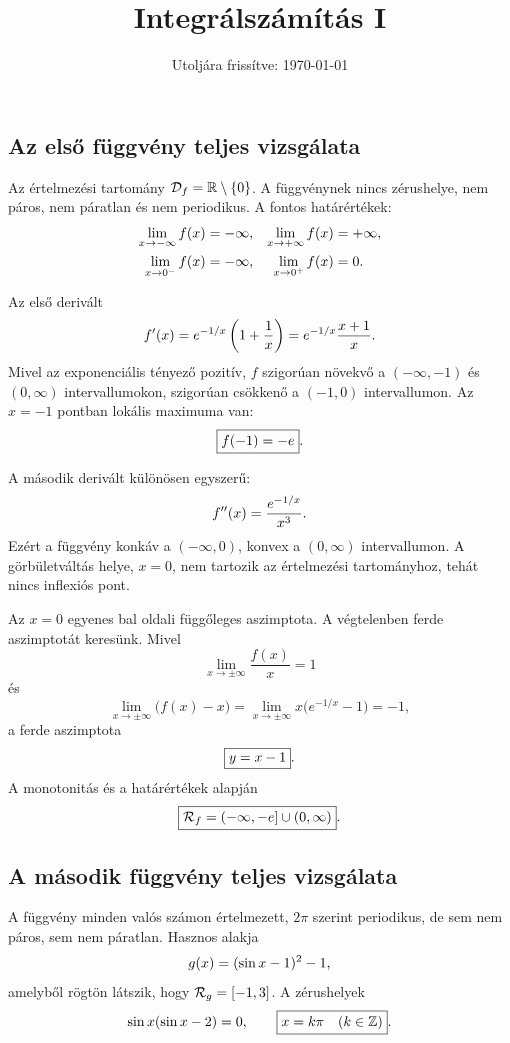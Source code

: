 \documentclass{szb-solution}
\title{Integrálszámítás I}
\date{Utoljára frissítve: \today}
\begin{document}
\maketitle

\subsection{Az első függvény teljes vizsgálata}

Az értelmezési tartomány $\mathcal{D}_f=\mathbb R\setminus\{0\}$. A függvénynek
nincs zérushelye, nem páros, nem páratlan és nem periodikus. A fontos
határértékek:
\begin{align*}
  \lim_{x\to-\infty}f(x)&=-\infty,
  &\lim_{x\to+\infty}f(x)&=+\infty,\\
  \lim_{x\to0^-}f(x)&=-\infty,
  &\lim_{x\to0^+}f(x)&=0
  \text.
\end{align*}

Az első derivált
$$
  f'(x)=e^{-1/x}\left(1+\frac1x\right)
       =e^{-1/x}\frac{x+1}{x}
  \text.
$$
Mivel az exponenciális tényező pozitív, $f$ szigorúan növekvő a
$(-\infty,-1)$ és $(0,\infty)$ intervallumokon, szigorúan csökkenő a
$(-1,0)$ intervallumon. Az $x=-1$ pontban lokális maximuma van:
$$
  \boxed{f(-1)=-e}
  \text.
$$

A második derivált különösen egyszerű:
$$
  f''(x)=\frac{e^{-1/x}}{x^3}
  \text.
$$
Ezért a függvény konkáv a $(-\infty,0)$, konvex a $(0,\infty)$
intervallumon. A görbületváltás helye, $x=0$, nem tartozik az értelmezési
tartományhoz, tehát nincs inflexiós pont.

Az $x=0$ egyenes bal oldali függőleges aszimptota. A végtelenben ferde
aszimptotát keresünk. Mivel
$$
  \lim_{x\to\pm\infty}\frac{f(x)}x=1
$$
és
$$
  \lim_{x\to\pm\infty}\bigl(f(x)-x\bigr)
  =\lim_{x\to\pm\infty}x\bigl(e^{-1/x}-1\bigr)=-1,
$$
a ferde aszimptota
$$
  \boxed{y=x-1}
  \text.
$$
A monotonitás és a határértékek alapján
$$
  \boxed{\mathcal{R}_f=(-\infty,-e]\cup(0,\infty)}
  \text.
$$

\subsection{A második függvény teljes vizsgálata}

A függvény minden valós számon értelmezett, $2\pi$ szerint periodikus, de
sem nem páros, sem nem páratlan. Hasznos alakja
$$
  g(x)=(\sin x-1)^2-1
  \text,
$$
amelyből rögtön látszik, hogy $\mathcal{R}_g=[-1,3]$. A zérushelyek
$$
  \sin x(\sin x-2)=0,
  \qquad
  \boxed{x=k\pi\quad(k\in\mathbb Z)}
  \text.
$$
\end{document}
